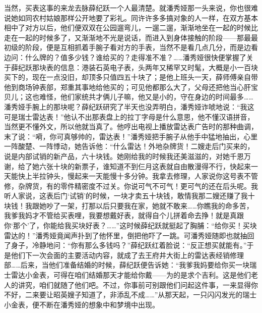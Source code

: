 \par 当然，买表这事的来龙去脉薛纪跃一个人最清楚。就潘秀娅那一头来说，你也很难说她如同农村姑娘那样公开地要了彩礼。同许许多多搞对象的人一样，在双方基本相中了对方以后，他们便双双在公园遛弯儿，一遛二遛，渐渐地坐在一起的时候比走在一起的时候多了，又渐渐地不光是说话，而进入到身体接触的阶段——那最最初级的阶段，便是互相抓着手腕子看对方的手表，当然不是看几点几分，而是边看边问：什么牌的？值多少钱？谁给买的？走得准不准？……潘秀娅很快便掌握了关于薛纪跃那块表的信息：港装石英电子表，头两年又稀罕又时髦，大概是小一百块买下的，现在一点没旧，却顶多只值四五十块了；是他上班头一天，薛师傅亲自带他到商场钟表部，郑重其事地给他买的；可见他都那么大了，父母还把他当心肝宝贝儿；这也难怪，他们家统共才俩儿子嘛，他又是小的，守在身边的时间最多……潘秀娅手腕上的那块呢？薛纪跃研究了半天也没弄明白，潘秀娅诈唬地说：“我这可是瑞士雷达表！”他认不出那表盘上的拉丁字母是什么意思，他不懂汉语拼音，当然更不懂外文，所以他就当真了。他哼出电视上播放雷达表广告时的那种曲调，末了说：“嗬，你可真够帅的，雷达表！”潘秀娅把手腕子从他手中猛地抽出，心里一阵酸楚、一阵悸动，她告诉他：“什么雷达！外地杂牌货！二嫂走后门买来的，说是内部试销的新产品，六十块钱。她刚给我的时候我还美滋滋的，对她千恩万谢，给了她六张十块的新票子，谁知道不到仨月这表就自由散漫得不行，快起来一天能快上半拉钟头，慢起来一天能慢十多分钟。我拿去修理，人家说你这号表不管修，杂牌货，有的零件精密度不过关。你说可气不可气！更可气的还在后头呢。我听人家说，这表后门‘试销’的时候，一块才卖五十块钱，敢情我那二嫂还赚了我十块钱！我跟她吵了一架，打那以后只要我在家，她就不敢来……你瞧我的命多苦，我爹我妈才不管给买表哩，我要想戴好表，就得自个儿拼着命去挣！就是真跟你‘那个’了，你能给我买块好表？……”这时候薛纪跃就挺起了胸脯：“给你买！买块雷达的！”潘秀娅竟闻声扑到了他怀里，倒把他吓了一跳。可潘秀娅随即也就抽回了身子，冷静地问：“你有那么多钱吗？”薛纪跃红着脸说：“反正想买就能有。”于是他们下一次会面的主要活动内容，就成了去王府井大街上的雷达表经销修理部……后来，当他们准备结婚的时候，薛纪跃便告诉她：“我爹我妈要给你买一块瑞士雷达小金表，可得在咱们结婚那天才能给你戴——为的是求个吉利。这是他们老人的讲究，咱们就随了他们吧。不过，你事前可别跟他们问起这件事，一来显得你不好，二来要让昭英嫂子知道了，非添乱不成……”从那天起，一只闪闪发光的瑞士小金表，便不断在潘秀娅的想象中和梦境中出现。
